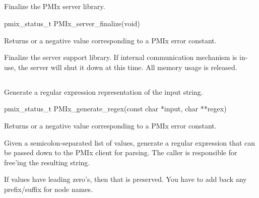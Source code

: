 \subsection{}

\summary

Finalize the PMIx server library.

\format

\cspecificstart
\begin{codepar}
pmix_status_t PMIx_server_finalize(void)
\end{codepar}
\cspecificend

Returns  or a negative value corresponding to a PMIx error constant.

\descr

Finalize the server support library.
If internal communication mechanism is in-use, the server will shut it down at this time.
All memory usage is released.


\subsection{}

\summary

Generate a regular expression representation of the input string.

\format

\cspecificstart
\begin{codepar}
pmix_status_t PMIx_generate_regex(const char *input, char **regex)
\end{codepar}
\cspecificend

\begin{arglist}
\end{arglist}

Returns  or a negative value corresponding to a PMIx error constant.

\descr

Given a semicolon-separated list of  values, generate a regular expression that can be passed down to the \ac{PMIx} client for parsing.
The caller is responsible for free'ing the resulting string.

If values have leading zero's, then that is preserved.
You have to add back any prefix/suffix for node names.

